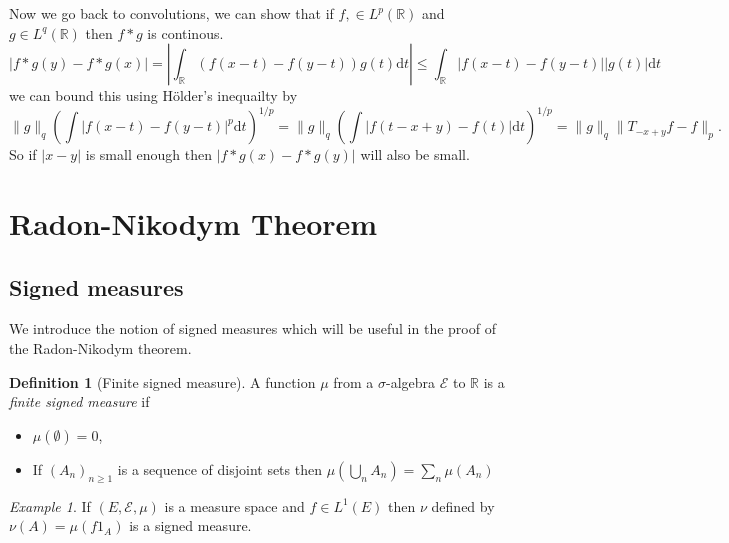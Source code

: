 \documentclass[11pt]{article}
\theoremstyle{definition}
\newtheorem{dfn}[thm]{Definition}
\theoremstyle{remark}
\newtheorem{ex}[thm]{Example}
\begin{document}
Now we go back to convolutions, we can show that if $f,  \in L^p(\mathbb{R})$ and $g \in L^q(\mathbb{R})$ then $f*g$ is continous. 
\[ |f*g(y) - f*g(x)| = |\int_{\mathbb{R}}(f(x-t) - f(y-t)) g(t) \mathrm{d}t| \leq \int_\mathbb{R} |f(x-t)-f(y-t)||g(t)| \mathrm{d}t  \]
we can bound this using H\"older's inequailty by
\[ \|g\|_q \left(\int |f(x-t) - f(y-t)|^p\mathrm{d}t\right)^{1/p} = \|g\|_q \left(\int |f(t-x+y) - f(t)| \mathrm{d}t\right)^{1/p} = \|g\|_q \| T_{-x+y} f - f\|_p. \] So if $|x-y|$ is small enough then $|f*g(x) - f*g(y)|$ will also be small.



\section{Radon-Nikodym Theorem}

\subsection{Signed measures}

We introduce the notion of signed measures which will be useful in the proof of the Radon-Nikodym theorem. 
\begin{dfn}[Finite signed measure]
A function $\mu$ from a $\sigma$-algebra $\mathcal{E}$ to $\mathbb{R}$ is a \emph{finite signed measure} if
\begin{itemize}
\item $\mu(\emptyset) = 0$,
\item If $(A_n)_{n \geq 1}$ is a sequence of disjoint sets then $\mu (\bigcup_n A_n) = \sum_n \mu(A_n)$
\end{itemize}
\end{dfn}
\begin{ex}
If $(E, \mathcal{E}, \mu)$ is a measure space and $f \in L^1(E)$ then $\nu$ defined by $\nu(A) = \mu(f1_A)$ is a signed measure.
\end{ex}
\end{document}
